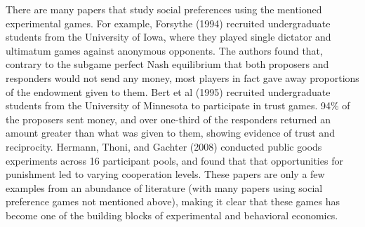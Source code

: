 \documentclass[12pt]{article}
\begin{document}
There are many papers that study social preferences using the mentioned experimental games. For example, Forsythe (1994) recruited undergraduate students from the University of Iowa, where they played single dictator and ultimatum games against anonymous opponents. The authors found that, contrary to the subgame perfect Nash equilibrium that both proposers and responders would not send any money, most players in fact gave away proportions of the endowment given to them. Bert et al (1995) recruited undergraduate students from the University of Minnesota to participate in trust games. 94\% of the proposers sent money, and over one-third of the responders returned an amount greater than what was given to them, showing evidence of trust and reciprocity. Hermann, Thoni, and Gachter (2008) conducted public goods experiments across 16 participant pools, and found that that opportunities for punishment led to varying cooperation levels. These papers are only a few examples from an abundance of literature (with many papers using social preference games not mentioned above), making it clear that these games has become one of the building blocks of experimental and behavioral economics. 
 
\end{document}
